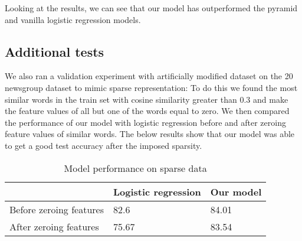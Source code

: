 Looking at the results, we can see that our model has outperformed the pyramid and vanilla logistic regression models.


\newpage
\subsection{Additional tests}

We also ran a validation experiment with artificially modified dataset on the 20 newsgroup dataset to mimic sparse representation: To do this we found the most similar words in the train set with cosine similarity greater than 0.3 and make the feature values of all but one of the words equal to zero. We then compared the performance of our model with logistic regression before and after zeroing feature values of similar words. The below results show that our model was able to get a good test accuracy after the imposed sparsity.\\


\begin{table}[htbp]
\centering
\begin{tabular}{l|l|l}
 & \multicolumn{1}{c|}{Logistic regression} & \multicolumn{1}{c}{Our model} \\ \hline
Before zeroing features & 82.6 & 84.01 \\
After zeroing features & 75.67 & 83.54
\end{tabular}
\caption{\label{tab:widgets}Model performance on sparse data}
\end{table}
